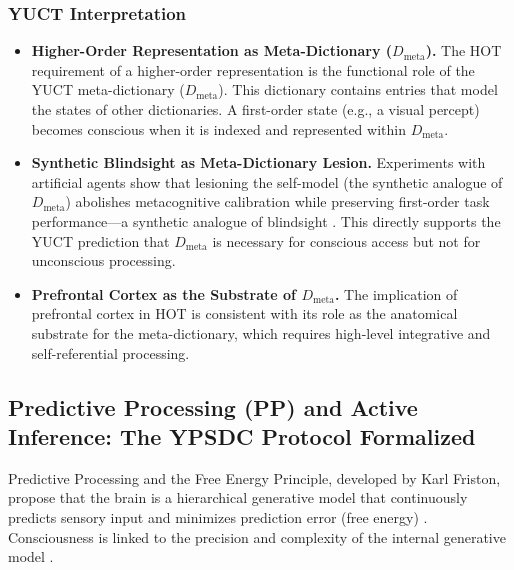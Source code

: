 \documentclass[12pt,a4paper]{article}
\begin{document}
	\subsubsection*{YUCT Interpretation}
	\begin{itemize}
		\item \textbf{Higher-Order Representation as Meta-Dictionary (\(D_{\text{meta}}\)).} The HOT requirement of a higher-order representation is the functional role of the YUCT meta-dictionary (\(D_{\text{meta}}\)). This dictionary contains entries that model the states of other dictionaries. A first-order state (e.g., a visual percept) becomes conscious when it is indexed and represented within \(D_{\text{meta}}\).
		\item \textbf{Synthetic Blindsight as Meta-Dictionary Lesion.} Experiments with artificial agents show that lesioning the self-model (the synthetic analogue of \(D_{\text{meta}}\)) abolishes metacognitive calibration while preserving first-order task performance---a synthetic analogue of blindsight \cite{Phua2026}. This directly supports the YUCT prediction that \(D_{\text{meta}}\) is necessary for conscious access but not for unconscious processing.
		\item \textbf{Prefrontal Cortex as the Substrate of \(D_{\text{meta}}\).} The implication of prefrontal cortex in HOT is consistent with its role as the anatomical substrate for the meta-dictionary, which requires high-level integrative and self-referential processing.
	\end{itemize}
	
	\subsection{Predictive Processing (PP) and Active Inference: The YPSDC Protocol Formalized}
	
	Predictive Processing and the Free Energy Principle, developed by Karl Friston, propose that the brain is a hierarchical generative model that continuously predicts sensory input and minimizes prediction error (free energy) \cite{Friston2010, Clark2016}. Consciousness is linked to the precision and complexity of the internal generative model \cite{Hohwy2013}.
	
\end{document}
